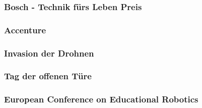     \subsubsection{Bosch - Technik fürs Leben Preis}

    \subsubsection{Accenture}

    \subsubsection{Invasion der Drohnen}

    \subsubsection{Tag der offenen Türe}

    \subsubsection{European Conference on Educational Robotics}
